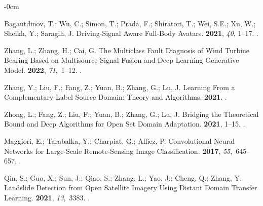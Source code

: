 \documentclass[mathematics,article,accept,pdftex,moreauthors]{Definitions/mdpi}
\begin{document}
\begin{adjustwidth}{-\extralength}{0cm}
\begin{thebibliography}{999}
Bagautdinov, T.; Wu, C.; Simon, T.; Prada, F.; Shiratori, T.; Wei, S.E.; Xu,
  W.; Sheikh, Y.; Saragih, J.
\newblock Driving-Signal Aware Full-Body Avatars.
 {\bf 2021}, {\em 40}, 1--17.
.

Zhang, L.; Zhang, H.; Cai, G.
\newblock The Multiclass Fault Diagnosis of Wind Turbine Bearing Based on
  Multisource Signal Fusion and Deep Learning Generative Model.
 {\bf
  2022}, {\em 71},~1--12.
.

Zhang, Y.; Liu, F.; Fang, Z.; Yuan, B.; Zhang, G.; Lu, J.
\newblock Learning From a Complementary-Label Source Domain: Theory and
  Algorithms.
 {\bf
  2021}. 
.

Zhong, L.; Fang, Z.; Liu, F.; Yuan, B.; Zhang, G.; Lu, J.
\newblock Bridging the Theoretical Bound and Deep Algorithms for Open Set
  Domain Adaptation.
 {\bf
  2021},  1--15. 
.

Maggiori, E.; Tarabalka, Y.; Charpiat, G.; Alliez, P.
\newblock Convolutional Neural Networks for Large-Scale Remote-Sensing Image
  Classification.
 {\bf
  2017}, {\em 55},~645--657.
.

Qin, S.; Guo, X.; Sun, J.; Qiao, S.; Zhang, L.; Yao, J.; Cheng, Q.; Zhang, Y.
\newblock Landslide Detection from Open Satellite Imagery Using Distant Domain
  Transfer Learning.
 {\bf 2021}, {\em 13},~3383.
.


\end{thebibliography}
\end{adjustwidth}
\end{document}
